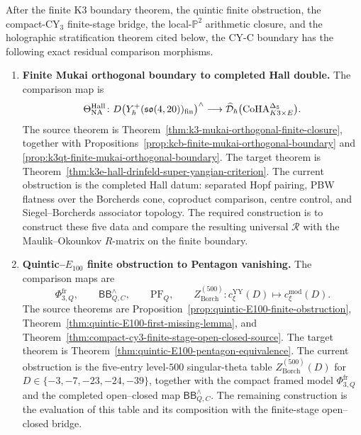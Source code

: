 \begin{proposition}
\label{prop:cy-c-residual-comparison-register}
After the finite K3 boundary theorem, the quintic finite obstruction, the
compact-CY$_3$ finite-stage bridge, the local-$\mathbb{P}^2$ arithmetic
closure, and the holographic stratification theorem cited below, the
CY-C boundary has the following exact residual comparison morphisms.
\begin{enumerate}[label=\textup{(\arabic*)}, leftmargin=2.5em]
\item \textbf{Finite Mukai orthogonal boundary to completed Hall double.}
The comparison map is
\[
 \Theta_{\mathrm{NA}}^{\mathrm{Hall}}\colon
 D\!\left(Y_\hbar^+(\mathfrak{so}(4,20))_{\mathrm{fin}}\right)^\wedge
 \longrightarrow
 \widehat{\mathcal{D}}_\hbar
 \bigl(\mathrm{CoHA}_{K3\times E}^{\Delta_5}\bigr).
\]
The source theorem is
Theorem~\ref{thm:k3-mukai-orthogonal-finite-closure}, together with
Propositions~\ref{prop:kcb-finite-mukai-orthogonal-boundary} and
\ref{prop:k3qt-finite-mukai-orthogonal-boundary}. The target theorem is
Theorem~\ref{thm:k3e-hall-drinfeld-super-yangian-criterion}. The current
obstruction is the completed Hall datum: separated Hopf pairing, PBW
flatness over the Borcherds cone, coproduct comparison, centre control,
and Siegel--Borcherds associator topology. The required construction is to
construct these five data and compare the resulting universal
$\mathcal R$ with the Maulik--Okounkov $R$-matrix on the finite boundary.

\item \textbf{Quintic--$E_{100}$ finite obstruction to Pentagon
vanishing.}
The comparison maps are
\[
 \Phi_{3,Q}^{\mathrm{fr}},\qquad
 \mathsf{BB}^{\wedge}_{Q,C},\qquad
 \mathrm{PF}_{Q},\qquad
 Z_{\mathrm{Borch}}^{(500)}\colon
 c_{\xi}^{\mathrm{YY}}(D)\mapsto c_{\xi}^{\mathrm{mod}}(D).
\]
The source theorems are
Proposition~\ref{prop:quintic-E100-finite-obstruction},
Theorem~\ref{thm:quintic-E100-first-missing-lemma}, and
Theorem~\ref{thm:compact-cy3-finite-stage-open-closed-source}. The
target theorem is
Theorem~\ref{thm:quintic-E100-pentagon-equivalence}. The current
obstruction is the five-entry level-$500$ singular-theta table
$Z_{\mathrm{Borch}}^{(500)}(D)$ for
$D\in\{-3,-7,-23,-24,-39\}$, together with the compact framed model
$\Phi_{3,Q}^{\mathrm{fr}}$ and the completed open--closed map
$\mathsf{BB}^{\wedge}_{Q,C}$. The remaining construction is the
evaluation of this table and its composition with the finite-stage
open--closed bridge.


\end{enumerate}
\end{proposition}
